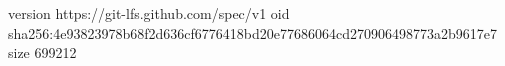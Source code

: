version https://git-lfs.github.com/spec/v1
oid sha256:4e93823978b68f2d636cf6776418bd20e77686064cd270906498773a2b9617e7
size 699212
